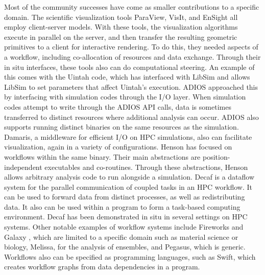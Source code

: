 \begin{refsection}
Most of the community successes have come as smaller contributions to a specific domain.
The scientific visualization tools ParaView, VisIt, and EnSight all employ client-server models.  With these tools, the visualization algorithms execute in parallel on the server, and then transfer the resulting geometric primitives to a client for interactive rendering.  To do this, they needed aspects of a workflow, including co-allocation of resources and data exchange.  Through their in situ interfaces, these tools also can do computational steering.  An example of this comes with the Uintah code, which has interfaced with LibSim and allows LibSim to set parameters that affect Uintah’s execution.
ADIOS approached this by interfacing with simulation codes through the I/O layer.  When simulation codes attempt to write through the ADIOS API calls, data is sometimes transferred to distinct resources where additional analysis can occur.  ADIOS also supports running distinct binaries on the same resources as the simulation.  Damaris, a middleware for efficient I/O on HPC simulations, also can facilitate visualization, again in a variety of configurations.
Henson has focused on workflows within the same binary.  Their main abstractions are position-independent executables and co-routines.  Through these abstractions, Henson allows arbitrary analysis code to run alongside a simulation.
Decaf is a dataflow system for the parallel communication of coupled tasks in an HPC workflow.   It can be used to forward data from distinct processes, as well as redistributing data.  It also can be used within a program to form a task-based computing environment.  Decaf has been demonstrated in situ in several settings on HPC systems.  Other notable examples of workflow systems include Fireworks \cite{Jain15} and Galaxy \cite{Afgan11}, which are limited to a specific domain such as material science or biology, Melissa, for the analysis of ensembles, and Pegasus, which is generic.  Workflows also can be specified as programming languages, such as Swift, which creates workflow graphs from data dependencies in a program.


\end{refsection}
